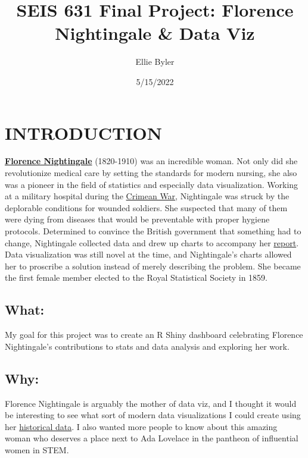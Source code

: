 \documentclass[
  dvipsnames]{article}
\title{SEIS 631 Final Project: Florence Nightingale \& Data Viz}
\author{Ellie Byler}
\date{5/15/2022}
\begin{document}
\maketitle

\hypertarget{section}{%
\section{\texorpdfstring{\textcolor{WildStrawberry}{INTRODUCTION}}{}}\label{section}}

\textbf{\href{https://en.wikipedia.org/wiki/Florence_Nightingale}{Florence
Nightingale}} (1820-1910) was an incredible woman. Not only did she
revolutionize medical care by setting the standards for modern nursing,
she also was a pioneer in the field of statistics and especially data
visualization. Working at a military hospital during the
\href{https://en.wikipedia.org/wiki/Crimean_War}{Crimean War},
Nightingale was struck by the deplorable conditions for wounded
soldiers. She suspected that many of them were dying from diseases that
would be preventable with proper hygiene protocols. Determined to
convince the British government that something had to change,
Nightingale collected data and drew up charts to accompany her
\href{https://curiosity.lib.harvard.edu/contagion/catalog/36-990101646750203941}{report}.
Data visualization was still novel at the time, and Nightingale's charts
allowed her to proscribe a solution instead of merely describing the
problem. She became the first female member elected to the Royal
Statistical Society in 1859.

\hypertarget{section-1}{%
\subsection{\texorpdfstring{\textcolor{TealBlue}{What:}}{}}\label{section-1}}

My goal for this project was to create an R Shiny dashboard celebrating
Florence Nightingale's contributions to stats and data analysis and
exploring her work.

\hypertarget{section-2}{%
\subsection{\texorpdfstring{\textcolor{TealBlue}{Why:}}{}}\label{section-2}}

Florence Nightingale is arguably the mother of data viz, and I thought
it would be interesting to see what sort of modern data visualizations I
could create using her
\href{https://github.com/vincentarelbundock/Rdatasets/blob/master/csv/HistData/Nightingale.csv}{historical
data}. I also wanted more people to know about this amazing woman who
deserves a place next to Ada Lovelace in the pantheon of influential
women in STEM.
\end{document}
